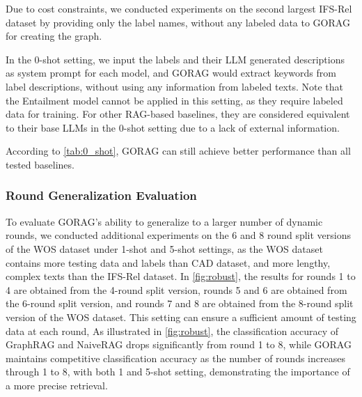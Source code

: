 Due to cost constraints, we conducted experiments on the second largest IFS-Rel dataset by providing only the label names, without any labeled data to GORAG for creating the graph.


In the 0-shot setting, we input the labels and their LLM generated descriptions as system prompt for each model, 
and GORAG would extract keywords from label descriptions, without using any information from labeled texts. 
Note that the Entailment model cannot be applied in this setting, as they require labeled data for training. For other RAG-based baselines, they are considered equivalent to their base LLMs in the 0-shot setting due to a lack of external information.

According to \autoref{tab:0_shot}, GORAG can still achieve better performance than all tested baselines.






\subsubsection{Round Generalization Evaluation}\label{sec:robuestness}
	To evaluate GORAG's ability to generalize to a larger number of dynamic rounds, 
we conducted additional experiments on the 6 and 8 round split versions of the WOS dataset under 1-shot and 5-shot settings, as the WOS dataset contains more testing data and labels than CAD dataset, and more lengthy, complex texts than the IFS-Rel dataset.
In \autoref{fig:robust}, the results for rounds 1 to 4 are obtained from the 4-round split version, rounds 5 and 6 are obtained from the 6-round split version, and rounds 7 and 8 are obtained from the 8-round split version of the WOS dataset. 
This setting can ensure a sufficient amount of testing data at each round,
As illustrated in \autoref{fig:robust}, the classification accuracy of GraphRAG and NaiveRAG drops significantly from round 1 to 8, 
while GORAG maintains competitive classification accuracy as the number of rounds increases through 1 to 8, with both 1 and 5-shot setting, 
demonstrating the importance of a more precise retrieval.



